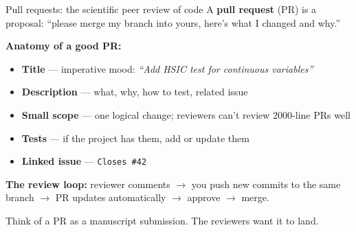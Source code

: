 \documentclass[10pt,aspectratio=169]{beamer}
\begin{document}
\begin{frame}{Pull requests: the scientific peer review of code}
  A \textbf{pull request} (PR) is a proposal: ``please merge my branch into yours,
  here's what I changed and why.''

  \vspace{0.5em}
  \textbf{Anatomy of a good PR:}
  \begin{itemize}
    \item \textbf{Title} --- imperative mood: \emph{``Add HSIC test for continuous variables''}
    \item \textbf{Description} --- what, why, how to test, related issue
    \item \textbf{Small scope} --- one logical change; reviewers can't review 2000-line PRs well
    \item \textbf{Tests} --- if the project has them, add or update them
    \item \textbf{Linked issue} --- \texttt{Closes \#42}
  \end{itemize}

  \vspace{0.5em}
  \textbf{The review loop:}
  reviewer comments $\to$ you push new commits to the same branch $\to$
  PR updates automatically $\to$ approve $\to$ merge.

  \vspace{0.5em}
  \begin{center}
    \footnotesize\color{ghMuted}
    Think of a PR as a manuscript submission. The reviewers want it to land.
  \end{center}
\end{frame}

\end{document}
